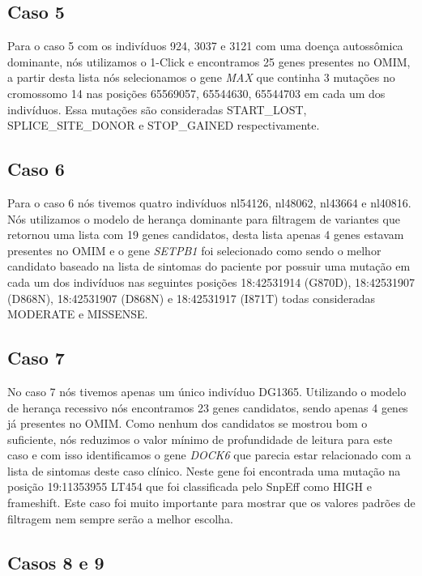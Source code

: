 \subsection{Caso 5}

Para o caso 5 com os indivíduos 924, 3037 e 3121 com uma doença autossômica dominante, nós utilizamos o 1-Click e encontramos 25 genes presentes no OMIM, a partir desta lista nós selecionamos o gene \textit{MAX} que continha 3 mutações no cromossomo 14 nas posições 65569057, 65544630, 65544703 em cada um dos indivíduos. Essa mutações são consideradas START\_LOST, SPLICE\_SITE\_DONOR e STOP\_GAINED respectivamente.


\subsection{Caso 6}

Para o caso 6 nós tivemos quatro indivíduos nl54126, nl48062, nl43664 e nl40816. Nós utilizamos o modelo de herança dominante para filtragem de variantes que retornou uma lista com 19 genes candidatos, desta lista apenas 4 genes estavam presentes no OMIM e o gene \textit{SETPB1} foi selecionado como sendo o melhor candidato baseado na lista de sintomas do paciente por possuir uma mutação em cada um dos indivíduos nas seguintes posições 18:42531914 (G870D), 18:42531907 (D868N), 18:42531907 (D868N) e 18:42531917 (I871T) todas consideradas MODERATE e MISSENSE.

\subsection{Caso 7}

No caso 7 nós tivemos apenas um único indivíduo DG1365. Utilizando o modelo de herança recessivo nós encontramos 23 genes candidatos, sendo apenas 4 genes já presentes no OMIM. Como nenhum dos candidatos se mostrou bom o suficiente, nós reduzimos o valor mínimo de profundidade de leitura para este caso e com isso identificamos o gene \textit{DOCK6} que parecia estar relacionado com a lista de sintomas deste caso clínico. Neste gene foi encontrada uma mutação na posição 19:11353955 LT454 que foi classificada pelo SnpEff como HIGH e frameshift. Este caso foi muito importante para mostrar que os valores padrões de filtragem nem sempre serão a melhor escolha.

\subsection{Casos 8 e 9}

